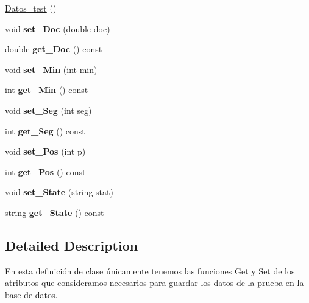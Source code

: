 \begin{DoxyCompactItemize}
\item 
\hyperlink{class_datos__test_a518fe33b48dbc4295caae0e31a898eac}{Datos\+\_\+test} ()
\item 
\mbox{\label{class_datos__test_a0f1c109350781b2007622cfb51c0a5a4}} 
void {\bfseries set\+\_\+\+Doc} (double doc)
\item 
\mbox{\label{class_datos__test_a5b40d39eebbfd74930600b3fb856a2e4}} 
double {\bfseries get\+\_\+\+Doc} () const
\item 
\mbox{\label{class_datos__test_a913f2f7a3c551d3b6987ac51102c65db}} 
void {\bfseries set\+\_\+\+Min} (int min)
\item 
\mbox{\label{class_datos__test_a2268dc2ea4e89461b79c19d2686507e9}} 
int {\bfseries get\+\_\+\+Min} () const
\item 
\mbox{\label{class_datos__test_a4d048327c82aa2df5a503fc872178c06}} 
void {\bfseries set\+\_\+\+Seg} (int seg)
\item 
\mbox{\label{class_datos__test_af038fc55b6ae25785fe1e6efd30fa6c0}} 
int {\bfseries get\+\_\+\+Seg} () const
\item 
\mbox{\label{class_datos__test_acb8431c61bfadd50e2fe85d2b9034b1d}} 
void {\bfseries set\+\_\+\+Pos} (int p)
\item 
\mbox{\label{class_datos__test_aeddd0117583ac8e91acf31113e52db99}} 
int {\bfseries get\+\_\+\+Pos} () const
\item 
\mbox{\label{class_datos__test_add125d5b391b7becf5ddc7af2f55f509}} 
void {\bfseries set\+\_\+\+State} (string stat)
\item 
\mbox{\label{class_datos__test_a660f6b408c58aa593d9b45882723efd3}} 
string {\bfseries get\+\_\+\+State} () const
\end{DoxyCompactItemize}


\subsection{Detailed Description}
En esta definición de clase únicamente tenemos las funciones Get y Set de los atributos que consideramos necesarios para guardar los datos de la prueba en la base de datos. 

